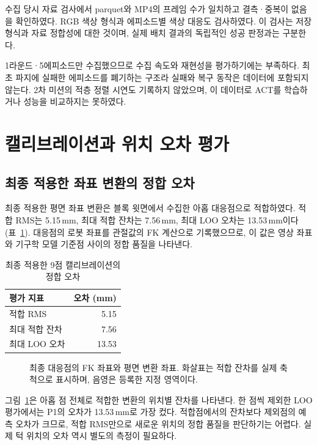 수집 당시 자료 검사에서 parquet와 MP4의 프레임 수가 일치하고 결측·중복이 없음을 확인하였다. RGB 색상 형식과 에피소드별 색상 대응도 검사하였다. 이 검사는 저장 형식과 자료 정합성에 대한 것이며, 실제 배치 결과의 독립적인 성공 판정과는 구분한다.

1라운드·5에피소드만 수집했으므로 수집 속도와 재현성을 평가하기에는 부족하다. 최초 파지에 실패한 에피소드를 폐기하는 구조라 실패와 복구 동작은 데이터에 포함되지 않는다. 2차 미션의 적층 정렬 시연도 기록하지 않았으며, 이 데이터로 ACT를 학습하거나 성능을 비교하지는 못하였다.

\section{캘리브레이션과 위치 오차 평가}
\subsection{최종 적용한 좌표 변환의 정합 오차}
\label{sec:calibration-results}
최종 적용한 평면 좌표 변환은 블록 윗면에서 수집한 아홉 대응점으로 적합하였다. 적합 RMS는 5.15\,mm, 최대 적합 잔차는 7.56\,mm, 최대 LOO 오차는 13.53\,mm이다(표~\ref{tab:calibration}). 대응점의 로봇 좌표를 관절값의 FK 계산으로 기록했으므로, 이 값은 영상 좌표와 기구학 모델 기준점 사이의 정합 품질을 나타낸다.

\begin{table}[htbp]
\centering
\caption{최종 적용한 9점 캘리브레이션의 정합 오차}\label{tab:calibration}
\begin{tabular}{@{}lr@{}}
\toprule 평가 지표 & 오차 (mm) \\
\midrule
적합 RMS & 5.15 \\
최대 적합 잔차 & 7.56 \\
최대 LOO 오차 & 13.53 \\
\bottomrule
\end{tabular}
\end{table}

\begin{figure}[htbp]
\centering

\caption{최종 대응점의 FK 좌표와 평면 변환 좌표. 화살표는 적합 잔차를 실제 축척으로 표시하며, 음영은 등록한 지정 영역이다.}
\label{fig:latest-calibration-map}
\end{figure}

그림~\ref{fig:latest-calibration-map}은 아홉 점 전체로 적합한 변환의 위치별 잔차를 나타낸다. 한 점씩 제외한 LOO 평가에서는 P1의 오차가 13.53\,mm로 가장 컸다. 적합점에서의 잔차보다 제외점의 예측 오차가 크므로, 적합 RMS만으로 새로운 위치의 정합 품질을 판단하기는 어렵다. 실제 턱 위치의 오차 역시 별도의 측정이 필요하다.
\FloatBarrier

